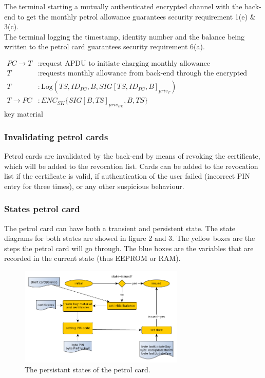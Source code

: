 The terminal starting a mutually authenticated encrypted channel with the back-end to get the monthly petrol allowance guarantees security requirement 1(e) \& 3(c).\\

The terminal logging the timestamp, identity number and the balance being written to the petrol card guarantees security requirement 6(a).

\begin{equation}\nonumber
\begin{split}
PC \to T&: \text{request APDU to initiate charging monthly allowance} \\
T&: \text{requests monthly allowance from back-end through the encrypted channel} \\
T&: \text{Log}(TS, ID_{PC}, B, SIG[TS, ID_{PC}, B]_{priv_T}) \\
T \to PC&: ENC_{SK}\{SIG[B,TS]_{priv_{BE}}, B, TS\}
\end{split} 
\end{equation}key material

\subsubsection{Invalidating petrol cards}
Petrol cards are invalidated by the back-end by means of revoking the certificate, which will be added to the revocation list. Cards can be added to the revocation list if the certificate is valid, if authentication of the user failed (incorrect PIN entry for three times), or any other suspicious behaviour. %

\subsubsection{States petrol card}
The petrol card can have both a transient and persistent state. The state diagrams for both states are showed in figure 2 and 3. The yellow boxes are the steps the petrol card will go through. The blue boxes are the variables that are recorded in the current state (thus EEPROM or RAM). 
\begin{figure}[!ht]
  \centering
    \includegraphics[width=0.7\textwidth]{persistant}
      \caption{The persistant states of the petrol card.}
\end{figure}

